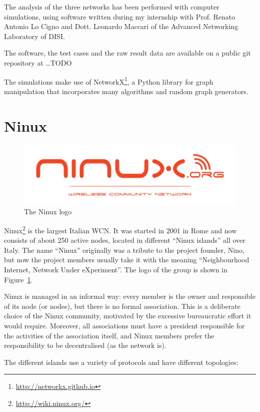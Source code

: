 \documentclass[a4paper,11pt,twoside,openright]{memoir}
\newcommand{\figref}[1] {Figure~\ref{#1}}
\begin{document}
The analysis of the three networks has been performed with computer
simulations, using software written during my internship with Prof. Renato
Antonio Lo Cigno and Dott. Leonardo Maccari of the Advanced Networking
Laboratory of DISI.

The software, the test cases and the raw result data are available on a public
git repository at \dots TODO %

The simulations make use of NetworkX\footnote{\url{http://networkx.github.io}},
a Python library for graph manipulation that incorporates many algorithms and
random graph generators.

\section{Ninux}\label{ninux}

\begin{figure}
  \centering
\includegraphics{images/ninux_logo.png}
  \caption{The Ninux logo}
  \label{fig:ninux_logo}
\end{figure}

Ninux\footnote{\url{http://wiki.ninux.org/}}
is the largest Italian WCN. It was started in 2001 in Rome and now
consists of about 250 active nodes, located in different ``Ninux
islands'' all over Italy. The name ``Ninux'' originally was a tribute to
the project founder, Nino, but now the project members usually take it
with the meaning ``Neighbourhood Internet, Network Under eXperiment''.
The logo of the group is shown in \figref{fig:ninux_logo}.

Ninux is managed in an informal way: every member is the owner and
responsible of its node (or nodes), but there is no formal association.
This is a deliberate choice of the Ninux community, motivated by the
excessive bureaucratic effort it would require. Moreover, all
associations must have a president responsible for the activities of the
association itself, and Ninux members prefer the responsibility to be
decentralised (as the network is).

The different islands use a variety of protocols and have different
topologies:
\end{document}
